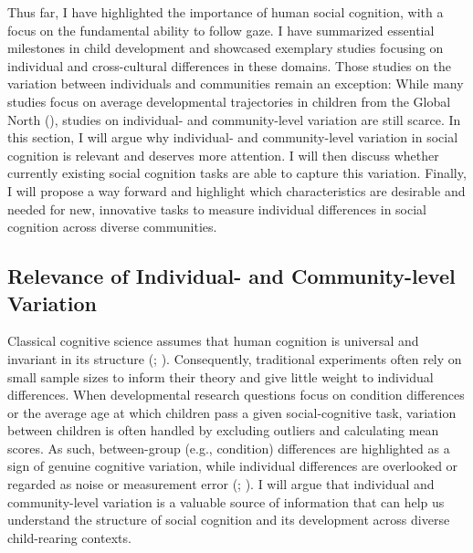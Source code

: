 \documentclass[
]{scrbook}
\begin{document}
Thus far, I have highlighted the importance of human social cognition, with a focus on the fundamental ability to follow gaze. I have summarized essential milestones in child development and showcased exemplary studies focusing on individual and cross-cultural differences in these domains. Those studies on the variation between individuals and communities remain an exception: While many studies focus on average developmental trajectories in children from the Global North (), studies on individual- and community-level variation are still scarce. In this section, I will argue why individual- and community-level variation in social cognition is relevant and deserves more attention. I will then discuss whether currently existing social cognition tasks are able to capture this variation. Finally, I will propose a way forward and highlight which characteristics are desirable and needed for new, innovative tasks to measure individual differences in social cognition across diverse communities.

\subsection{Relevance of Individual- and Community-level Variation}\label{relevance-of-individual--and-community-level-variation}

Classical cognitive science assumes that human cognition is universal and invariant in its structure (; ). Consequently, traditional experiments often rely on small sample sizes to inform their theory and give little weight to individual differences. When developmental research questions focus on condition differences or the average age at which children pass a given social-cognitive task, variation between children is often handled by excluding outliers and calculating mean scores. As such, between-group (e.g., condition) differences are highlighted as a sign of genuine cognitive variation, while individual differences are overlooked or regarded as noise or measurement error (; ). I will argue that individual and community-level variation is a valuable source of information that can help us understand the structure of social cognition and its development across diverse child-rearing contexts.
\end{document}
